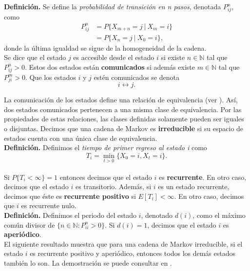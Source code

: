\documentclass[11pt,a4paper]{article}
\begin{document}
\textbf{Definición.} Se define la \textit{probabilidad de transición en n pasos}, denotada $P_{ij}^n$, como
\begin{align*}
P_{ij}^n &= P\lbrace X_{m+n} = j \ | \ X_{m} = i\rbrace\\
&= P\lbrace X_n = j \ | \ X_0 = i \rbrace,
\end{align*}
donde la última igualdad se sigue de la homogeneidad de la cadena.\\

Se dice que el estado $j$ es accesible desde el estado $i$ si existe $n \in \mathbb{N}$ tal que $P_{ij}^n > 0$. Estos dos estados están \textbf{comunicados} si además existe $m \in \mathbb{N}$ tal que $P_{ji}^m > 0$. Que los estados $i$ y $j$ estén comunicados se denota
\begin{equation} \label{clase_eq}
i \leftrightarrow j.
\end{equation}

La comunicación de los estados define una relación de equivalencia (ver \citet{ross}). Así, dos estados comunicados pertenecen a una misma clase de equivalencia. Por las propiedades de estas relaciones, las clases definidas solamente pueden ser iguales o disjuntas. Decimos que una cadena de Markov es \textbf{irreducible} si su espacio de estados cuenta con una única clase de equivalencia.\\

\textbf{Definición.} Definimos el \textit{tiempo de primer regreso al estado i} como $$T_i = \min_{t>0} \lbrace X_0 = i, X_t = i \rbrace.$$\\

Si $P\lbrace T_i < \infty \rbrace = 1 $ entonces decimos que el estado $i$ es \textbf{recurrente}. En otro caso, decimos que el estado $i$ es transitorio. Además, si $i$ es un estado recurrente, decimos que éste es \textbf{recurrente positivo} si $E\left[T_i\right] < \infty$. En otro caso, decimos que $i$ es recurrente nulo.\\

\textbf{Definición.} Definimos el periodo del estado $i$, denotado $d(i)$, como el máximo común divisor de $\lbrace n\in \mathbb{N}: P_{ii}^n > 0\rbrace.$ Si $d(i)=1$, decimos que el estado $i$ es \textbf{aperiódico}.\\

El siguiente resultado muestra que para una cadena de Markov irreducible, si el estado $i$ es recurrente positivo y aperiódico, entonces todos los demás estados también lo son. La demostración se puede consultar en \citep{ross}.
\end{document}
